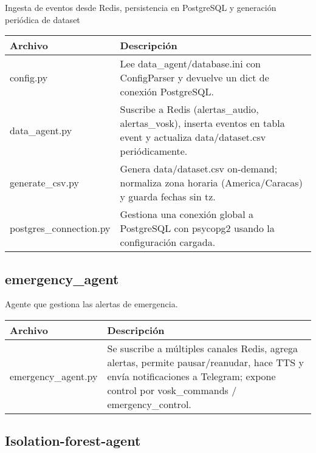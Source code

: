Ingesta de eventos desde Redis, persistencia en PostgreSQL y generación periódica de dataset

\begin{table}[H]
  \doublespacing
  \begin{tabularx}{\textwidth}{l X}
    \hline
    \textbf{Archivo}        & \textbf{Descripción}                                                                                                          \\
    \hline
    config.py               & Lee data\_agent/database.ini con ConfigParser y devuelve un dict de conexión PostgreSQL.                                      \\
    data\_agent.py          & Suscribe a Redis (alertas\_audio, alertas\_vosk), inserta eventos en tabla event y actualiza data/dataset.csv periódicamente. \\
    generate\_csv.py        & Genera data/dataset.csv on-demand; normaliza zona horaria (America/Caracas) y guarda fechas sin tz.                           \\
    postgres\_connection.py & Gestiona una conexión global a PostgreSQL con psycopg2 usando la configuración cargada.                                       \\
    \hline
  \end{tabularx}
\end{table}

\subsection*{emergency\_agent}

Agente que gestiona las alertas de emergencia.

\begin{table}[H]
  \doublespacing
  \begin{tabularx}{\textwidth}{l X}
    \hline
    \textbf{Archivo}    & \textbf{Descripción} \\
    \hline
    emergency\_agent.py &
    Se suscribe a múltiples canales Redis, agrega alertas, permite pausar/reanudar, hace TTS y envía notificaciones a Telegram; expone control por vosk\_commands / emergency\_control.
    \\
    \hline
  \end{tabularx}
\end{table}

\subsection*{Isolation-forest-agent}

